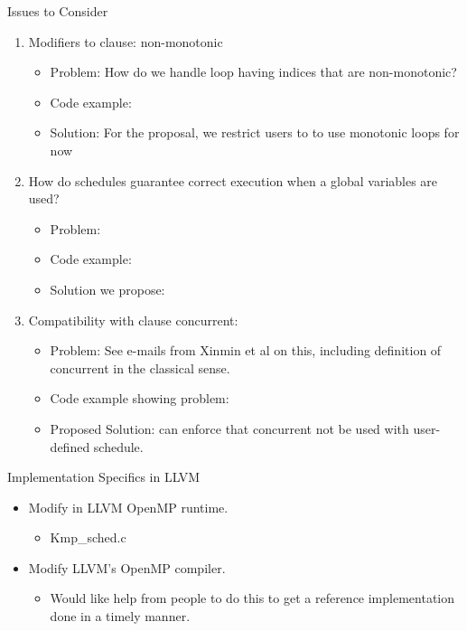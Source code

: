 \begin{frame}{Issues to Consider}
\begin{enumerate} 
\item Modifiers to clause: non-monotonic 
\begin{itemize}
\item Problem: How do we handle loop having indices that are non-monotonic?
\item Code example: 
\item Solution: For the proposal, we restrict users to to use monotonic loops for now
\end{itemize}
\item How do schedules guarantee correct execution when a global variables are used?
\begin{itemize}
\item Problem: 
\item Code example: 
\item Solution we propose: 
\end{itemize}

\item Compatibility with clause concurrent: 
\begin{itemize}
\item Problem: See e-mails from Xinmin et al on this, including definition of concurrent in the classical sense.
\item Code example showing problem:
\item Proposed Solution: can enforce that concurrent not be used with user-defined schedule. 
\end{itemize}
\end{enumerate}

\end{frame}


\begin{frame}{Implementation Specifics in LLVM} 

\begin{itemize}
\item Modify in LLVM OpenMP runtime. 
\begin{itemize}
\small \item \small Kmp\_sched.c
\end{itemize}


\item Modify LLVM's OpenMP compiler. 
\begin{itemize}
\small \item \small Would like help from people to do this to get a reference implementation done in a timely manner. 
\end{itemize} 

\end{itemize}

\end{frame}



